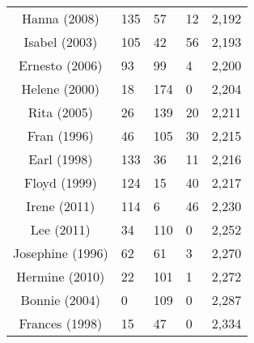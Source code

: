 \begin{table}[ht]
\begin{tabular}{cP{3cm}P{3cm}P{3cm}P{3cm}}
  Hanna (2008) & 135 & 57 & 12 & 2,192 \\ 
  Isabel (2003) & 105 & 42 & 56 & 2,193 \\ 
  Ernesto (2006) & 93 & 99 & 4 & 2,200 \\ 
  Helene (2000) & 18 & 174 & 0 & 2,204 \\ 
  Rita (2005) & 26 & 139 & 20 & 2,211 \\ 
  Fran (1996) & 46 & 105 & 30 & 2,215 \\ 
  Earl (1998) & 133 & 36 & 11 & 2,216 \\ 
  Floyd (1999) & 124 & 15 & 40 & 2,217 \\ 
  Irene (2011) & 114 & 6 & 46 & 2,230 \\ 
  Lee (2011) & 34 & 110 & 0 & 2,252 \\ 
  Josephine (1996) & 62 & 61 & 3 & 2,270 \\ 
  Hermine (2010) & 22 & 101 & 1 & 2,272 \\ 
  Bonnie (2004) & 0 & 109 & 0 & 2,287 \\ 
  Frances (1998) & 15 & 47 & 0 & 2,334 \\ 
   \bottomrule
\end{tabular}
\end{table}
